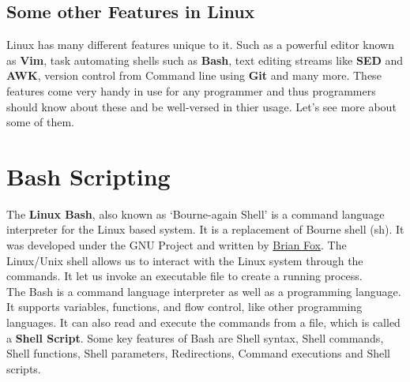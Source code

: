 \documentclass[12pt]{article}
\begin{document}
\subsection{Some other Features in Linux}
Linux has many different features unique to it. Such as a powerful editor known as \textbf{Vim}, task automating shells such as \textbf{Bash}, text editing streams like \textbf{SED} and \textbf{AWK}, version control from Command line using \textbf{Git} and many more. These features come very handy in use for any programmer and thus programmers should know about these and be well-versed in thier usage. Let's see more about some of them.

\newpage

\section{Bash Scripting}
\vspace{1 em}
The \textbf{Linux Bash}\cite{Bash:4}, also known as `Bourne-again Shell' is a command language interpreter for the Linux based system. It is a replacement of Bourne shell (sh). It was developed under the GNU Project and written by \underline{Brian Fox}. The Linux/Unix shell allows us to interact with the Linux system through the commands. It let us invoke an executable file to create a running process. \\
The Bash is a command language interpreter as well as a programming language. It supports variables, functions, and flow control, like other programming languages. It can also read and execute the commands from a file, which is called a \textbf{Shell Script}\cite{LinuxBash:5}. Some key features of Bash are Shell syntax, Shell commands, Shell functions, Shell parameters, Redirections, Command executions and Shell scripts.
\end{document}
